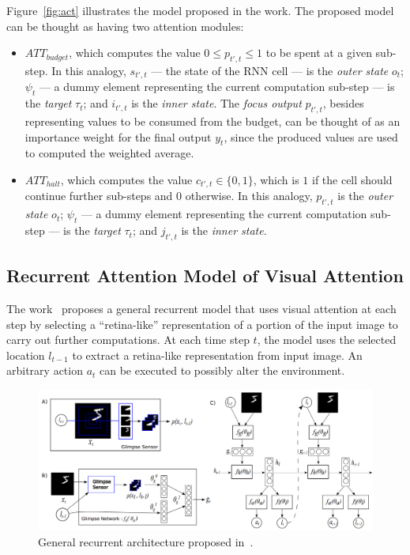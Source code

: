 \documentclass[11pt]{article}
\begin{document}
Figure~\ref{fig:act} illustrates the model proposed in the work.
The proposed model can be thought as having two attention modules:
\begin{itemize}
    \item \textbf{$ATT_{budget}$}, which computes the value $0 \le p_{t',t} \le 1$ to be spent at a given sub-step.
        In this analogy, $s_{t',t}$ --- the state of the RNN cell --- is the \emph{outer state} $o_t$;
        $\psi_t$ --- a dummy element representing the current computation sub-step --- is the \emph{target} $\tau_t$;
        and $i_{t',t}$ is the \emph{inner state}.
        The \emph{focus output} $p_{t',t}$, besides representing values to be consumed from the budget,
        can be thought of as an importance weight for the final output $y_t$, since the produced values are used to computed
        the weighted average.
    \item \textbf{$ATT_{halt}$}, which computes the value $c_{t',t} \in \{0, 1\}$, which is $1$ if the cell should continue
        further sub-steps and $0$ otherwise.
        In this analogy, $p_{t',t}$ is the \emph{outer state} $o_t$;
        $\psi_t$ --- a dummy element representing the current computation sub-step --- is the \emph{target} $\tau_t$;
        and $j_{t',t}$ is the \emph{inner state}.
\end{itemize}

\subsection{Recurrent Attention Model of Visual Attention}
The work~\cite{ref:ram} proposes a general recurrent model that uses visual attention at each step
by selecting a ``retina-like'' representation of a portion of the input image to carry out further computations.
At each time step $t$, the model uses the selected location $l_{t-1}$ to extract a retina-like representation
from input image.
An arbitrary action $a_t$ can be executed to possibly alter the environment.

\begin{figure}[H]
    \centering
    \includegraphics[width=1.0\linewidth]{./img/ram.png}
    \caption{General recurrent architecture proposed in~\cite{ref:ram}.}
\end{figure}
\end{document}
